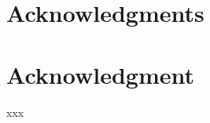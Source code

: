 \documentclass[conference,compsoc]{IEEEtran}
\begin{document}
\ifCLASSOPTIONcompsoc
  \section*{Acknowledgments}
\else
  \section*{Acknowledgment}
\fi



%
%
\begin{thebibliography}{1}
 xxx
\end{thebibliography}





\end{document}
